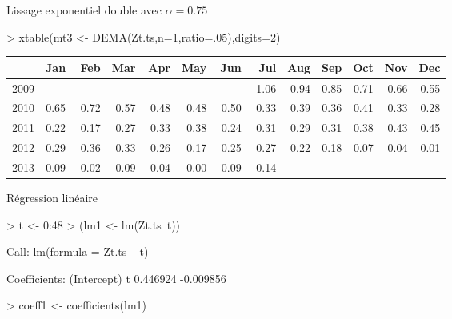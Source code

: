 \documentclass{article}
\begin{document}
\clearpage 
Lissage exponentiel double avec $\alpha=0.75$
\begin{Schunk}
\begin{Sinput}
> xtable(mt3 <- DEMA(Zt.ts,n=1,ratio=.05),digits=2)
\end{Sinput}
\begin{table}[ht]
\centering
\begin{tabular}{rrrrrrrrrrrrr}
  \hline
 & Jan & Feb & Mar & Apr & May & Jun & Jul & Aug & Sep & Oct & Nov & Dec \\ 
  \hline
2009 &  &  &  &  &  &  & 1.06 & 0.94 & 0.85 & 0.71 & 0.66 & 0.55 \\ 
  2010 & 0.65 & 0.72 & 0.57 & 0.48 & 0.48 & 0.50 & 0.33 & 0.39 & 0.36 & 0.41 & 0.33 & 0.28 \\ 
  2011 & 0.22 & 0.17 & 0.27 & 0.33 & 0.38 & 0.24 & 0.31 & 0.29 & 0.31 & 0.38 & 0.43 & 0.45 \\ 
  2012 & 0.29 & 0.36 & 0.33 & 0.26 & 0.17 & 0.25 & 0.27 & 0.22 & 0.18 & 0.07 & 0.04 & 0.01 \\ 
  2013 & 0.09 & -0.02 & -0.09 & -0.04 & 0.00 & -0.09 & -0.14 &  &  &  &  &  \\ 
   \hline
\end{tabular}
\end{table}\end{Schunk}
\clearpage 
Régression linéaire
\begin{Schunk}
\begin{Sinput}
> t <- 0:48
> (lm1 <- lm(Zt.ts~t))
\end{Sinput}
\begin{Soutput}
Call:
lm(formula = Zt.ts ~ t)

Coefficients:
(Intercept)            t  
   0.446924    -0.009856  
\end{Soutput}
\begin{Sinput}
> coeff1 <- coefficients(lm1)
\end{Sinput}
\end{Schunk}
\end{document}
